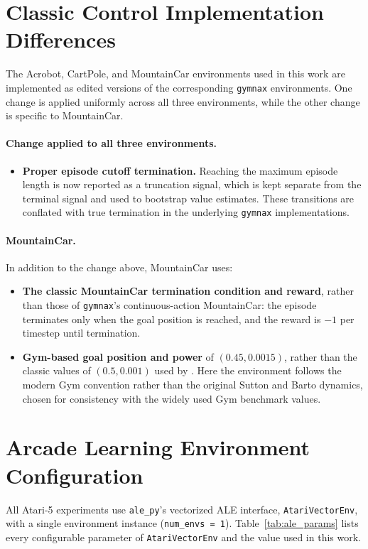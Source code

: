 \section{Classic Control Implementation Differences} \label{app_classic_control_diffs}
The Acrobot, CartPole, and MountainCar environments used in this work are implemented as edited versions of the corresponding \texttt{gymnax}  environments. One change is applied uniformly across all three environments, while the other change is specific to MountainCar. 

\paragraph{Change applied to all three environments.}
\begin{itemize}
    \item \textbf{Proper episode cutoff termination.} Reaching the maximum episode length is now reported as a truncation signal, which is kept separate from the terminal signal and used to bootstrap value estimates. These transitions are conflated with true termination in the underlying \texttt{gymnax} implementations.
\end{itemize}

\paragraph{MountainCar.} In addition to the change above, MountainCar uses:
\begin{itemize}
    \item \textbf{The classic MountainCar termination condition and reward}, rather than those of \texttt{gymnax}'s continuous-action MountainCar: the episode terminates only when the goal position is reached, and the reward is $-1$ per timestep until termination.
    \item \textbf{Gym-based goal position and power} of $(0.45, 0.0015)$, rather than the classic values of $(0.5, 0.001)$ used by \cite{sutton1998introduction}. Here the environment follows the modern Gym convention rather than the original Sutton and Barto dynamics, chosen for consistency with the widely used Gym benchmark values.
\end{itemize}


\FloatBarrier
\section{Arcade Learning Environment Configuration} \label{app_ale_params}
All Atari-5 experiments use \texttt{ale\_py}'s vectorized ALE interface, \texttt{AtariVectorEnv}, with a single environment instance (\texttt{num\_envs = 1}). Table~\ref{tab:ale_params} lists every configurable parameter of \texttt{AtariVectorEnv} and the value used in this work.

